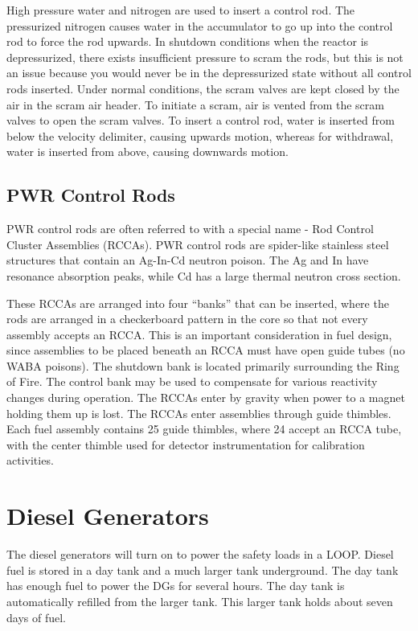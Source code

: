 \documentclass[10pt]{article}
\newcounter{subsubsubsection}[subsubsection]
\begin{document}

High pressure water and nitrogen are used to insert a control rod. The pressurized nitrogen causes water in the accumulator to go up into the control rod to force the rod upwards. In shutdown conditions when the reactor is depressurized, there exists insufficient pressure to scram the rods, but this is not an issue because you would never be in the depressurized state without all control rods inserted. Under normal conditions, the scram valves are kept closed by the air in the scram air header. To initiate a scram, air is vented from the scram valves to open the scram valves. To insert a control rod, water is inserted from below the velocity delimiter, causing upwards motion, whereas for withdrawal, water is inserted from above, causing downwards motion. 


\subsection{PWR Control Rods}

PWR control rods are often referred to with a special name - Rod Control Cluster Assemblies (RCCAs). PWR control rods are spider-like stainless steel structures that contain an Ag-In-Cd neutron poison. The Ag and In have resonance absorption peaks, while Cd has a large thermal neutron cross section. 

These RCCAs are arranged into four ``banks'' that can be inserted, where the rods are arranged in a checkerboard pattern in the core so that not every assembly accepts an RCCA. This is an important consideration in fuel design, since assemblies to be placed beneath an RCCA must have open guide tubes (no WABA poisons). The shutdown bank is located primarily surrounding the Ring of Fire. The control bank may be used to compensate for various reactivity changes during operation. The RCCAs enter by gravity when power to a magnet holding them up is lost. The RCCAs enter assemblies through guide thimbles. Each fuel assembly contains 25 guide thimbles, where 24 accept an RCCA tube, with the center thimble used for detector instrumentation for calibration activities. 


\section{Diesel Generators}

The diesel generators will turn on to power the safety loads in a LOOP. Diesel fuel is stored in a day tank and a much larger tank underground. The day tank has enough fuel to power the DGs for several hours. The day tank is automatically refilled from the larger tank. This larger tank holds about seven days of fuel. 
\end{document}
